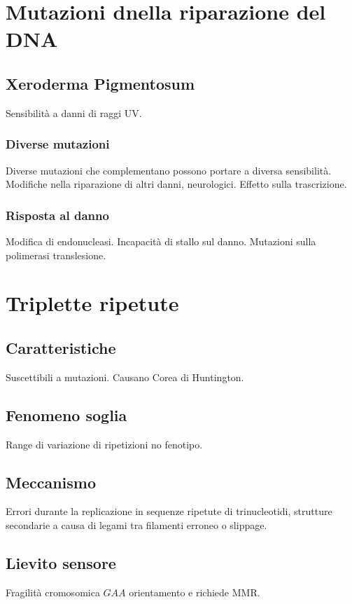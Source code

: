 \section{Mutazioni dnella riparazione del DNA}

	\subsection{Xeroderma Pigmentosum}
	Sensibilit\`a a danni di raggi UV.

		\subsubsection{Diverse mutazioni}
		Diverse mutazioni che complementano possono portare a diversa sensibilit\`a.
		Modifiche nella riparazione di altri danni, neurologici.
		Effetto sulla trascrizione.

		\subsubsection{Risposta al danno}
		Modifica di endonucleasi.
		Incapacit\`a di stallo sul danno.
		Mutazioni sulla polimerasi translesione.

\section{Triplette ripetute}

	\subsection{Caratteristiche}
	Suscettibili a mutazioni.
	Causano Corea di Huntington.

	\subsection{Fenomeno soglia}
	Range di variazione di ripetizioni no fenotipo.

	\subsection{Meccanismo}
	Errori durante la replicazione in sequenze ripetute di trinucleotidi, strutture secondarie a causa di legami tra filamenti erroneo o slippage.

	\subsection{Lievito sensore}
	Fragilit\`a cromosomica $GAA$ orientamento e richiede MMR.


